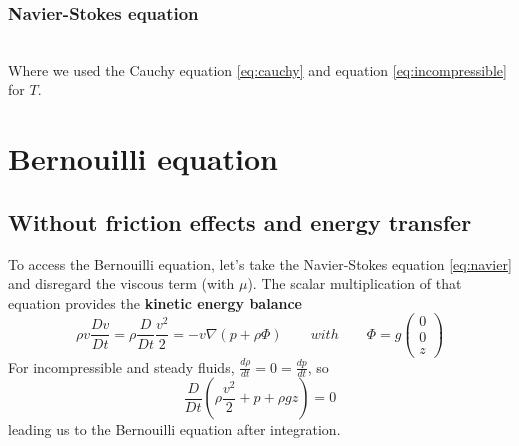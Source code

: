 		\subsubsection{Navier-Stokes equation}
		\ \\ Where we used the Cauchy equation \autoref{eq:cauchy} and equation \autoref{eq:incompressible} for $T$. 
		
\section{Bernouilli equation}
	\subsection{Without friction effects and energy transfer}
	To access the Bernouilli equation, let's take the Navier-Stokes equation \autoref{eq:navier} and disregard the viscous term (with $\mu$). The scalar multiplication of that equation provides the \textbf{kinetic energy balance}
	\begin{equation}
		\rho v \frac{Dv}{Dt} = \rho \frac{D}{Dt} \frac{v^2}{2} = -v\nabla (p + \rho \Phi) 
		\qquad with \qquad 
		\Phi = g
		\left(
		\begin{array}{c}
		0 \\
		0 \\
		z
		\end{array}
		\right)
	\end{equation}
	For incompressible and steady fluids, $\frac{d\rho}{dt} = 0 = \frac{dp}{dt}$, so 
	\begin{equation}
		\frac{D}{Dt}\left( \rho \frac{v^2}{2} + p + \rho g z \right)	 = 0 
	\end{equation}	 
		leading us to the Bernouilli equation after integration. \\
		
